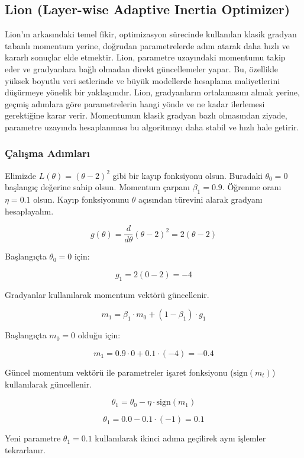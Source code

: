 \newpage

\subsection{Lion (Layer-wise Adaptive Inertia Optimizer)}

Lion'ın arkasındaki temel fikir, optimizasyon sürecinde kullanılan klasik gradyan tabanlı momentum yerine, doğrudan parametrelerde adım atarak daha hızlı ve kararlı sonuçlar elde etmektir. Lion, parametre uzayındaki momentumu takip eder ve gradyanlara bağlı olmadan direkt güncellemeler yapar. Bu, özellikle yüksek boyutlu veri setlerinde ve büyük modellerde hesaplama maliyetlerini düşürmeye yönelik bir yaklaşımdır. Lion, gradyanların ortalamasını almak yerine, geçmiş adımlara göre parametrelerin hangi yönde ve ne kadar ilerlemesi gerektiğine karar verir. Momentumun klasik gradyan bazlı olmasından ziyade, parametre uzayında hesaplanması bu algoritmayı daha stabil ve hızlı hale getirir.

\subsubsection{Çalışma Adımları}

Elimizde $L(\theta) = (\theta - 2)^2$ gibi bir kayıp fonksiyonu olsun. Buradaki $\theta_0 = 0$ başlangıç değerine sahip olsun. Momentum çarpanı $\beta_1 = 0.9$. Öğrenme oranı $\eta = 0.1$ olsun. Kayıp fonksiyonunu $\theta$ açısından türevini alarak gradyanı hesaplayalım.

\[ g(\theta) = \frac{d}{d \theta} (\theta - 2)^2 = 2 (\theta - 2) \]

Başlangıçta $\theta_0 = 0$ için:

\[ g_1 = 2 (0 - 2) = -4 \]

Gradyanlar kullanılarak momentum vektörü güncellenir.

\[ m_1 = \beta_1 \cdot m_0 + (1 - \beta_1) \cdot g_1 \]

Başlangıçta $m_0 = 0$ olduğu için:

\[ m_1 = 0.9 \cdot 0 + 0.1 \cdot (-4) = -0.4 \]

Güncel momentum vektörü ile parametreler işaret fonksiyonu ($\text{sign}(m_t)$) kullanılarak güncellenir.

\[ \theta_1 = \theta_0 - \eta \cdot \text{sign}(m_1) \]

\[ \theta_1 = 0.0 - 0.1 \cdot (-1) = 0.1 \]

Yeni parametre $\theta_1 = 0.1$ kullanılarak ikinci adıma geçilirek aynı işlemler tekrarlanır.

